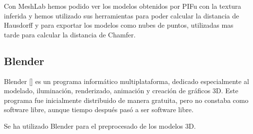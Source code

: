 Con MeshLab hemos podido ver los modelos obtenidos por PIFu con la textura inferida y hemos utilizado sus herramientas para poder calcular la distancia de Hausdorff y para exportar los modelos como nubes de puntos, utilizadas mas tarde para calcular la distancia de Chamfer.
\subsection{Blender}
Blender [\cite{blender}] es un programa informático multiplataforma, dedicado especialmente al modelado, iluminación, renderizado, animación y creación de gráficos 3D. Este programa fue inicialmente distribuido de manera gratuita, pero no constaba como software libre, aunque tiempo después pasó a ser software libre.

Se ha utilizado Blender para el preprocesado de los modelos 3D.


